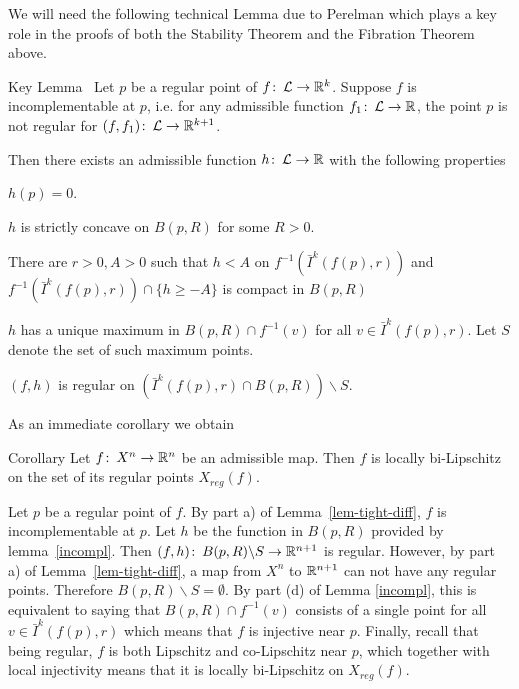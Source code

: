  
 
 We will need the following  technical Lemma  due to Perelman which plays a key  role in the proofs of both the Stability Theorem and the Fibration Theorem above.

\begin{thm}{Key Lemma}\label{incompl}~\cite[Section 3]{Per-Morse}
 Let $p$ be a regular point of $f\co \spc{L}\to \R^k$.  Suppose $f$ is incomplementable at $p$, i.e.  for any admissible function  $f_1\co \spc{L}\to\R$, the point $p$ is not regular for $(f,f_1)\co \spc{L}\to \R^{k+1}$. 

Then there exists an admissible function $h\co \spc{L}\to\R$ with the following properties

\begin{subthm}{}  $h(p)=0$.
\end{subthm}

\begin{subthm}{} $h$ is strictly concave on $B(p,R)$ for some $R>0$.
\end{subthm}

\begin{subthm}{} There are $r>0, A>0$ such that  $h< A$ on $f^{-1}\left(\bar{I}^k(f(p),r) \right)$ and   $f^{-1}\left(\bar{I}^k(f(p),r) \right)\cap  \{h\ge -A\}$ is compact in $B(p,R)$\label{h-proper}
\end{subthm}


\begin{subthm}{} \label{kl-reg}$h$ has a unique maximum in $B(p,R)\cap f^{-1}(v)$ for all $v\in \bar{I}^k(f(p),r) $.  Let $S$ denote the set of such maximum points.
\item $(f,h)$ is regular on $\left(\bar{I}^k(f(p),r) \cap B(p,R)\right)\backslash S$.
\end{subthm}
\end{thm}


As an immediate corollary we obtain

\begin{thm}{Corollary}\label{bilip}
Let $f\co X^n\to\R^n$ be an admissible map. Then $f$ is locally bi-Lipschitz on the set of its regular points $X_{reg}(f)$.
\end{thm}


Let $p$ be a regular point of $f$.  By part a) of Lemma~\ref{lem-tight-diff}, $f$ is incomplementable at $p$. Let $h$ be the function in $B(p,R)$ provided by lemma~\ref{incompl}.  Then $(f,h)\co B(p,R)\backslash S\to\R^{n+1}$ is regular. However,  by part a) of Lemma~\ref{lem-tight-diff},  a map from $X^n$ to $\mathbb{R}^{n+1}$ can not have any regular points. Therefore $B(p,R)\backslash S=\emptyset$. By part (d) of Lemma \ref{incompl}, this is equivalent to saying that $B(p,R)\cap f^{-1}(v)$  consists of a single point for all $v\in \bar{I}^k(f(p),r)$  which means that $f$ is  injective near $p$. Finally, recall that being regular,  $f$ is both Lipschitz and co-Lipschitz near $p$, which together with local injectivity means that it is locally bi-Lipschitz on  $X_{reg}(f)$.\qeds

